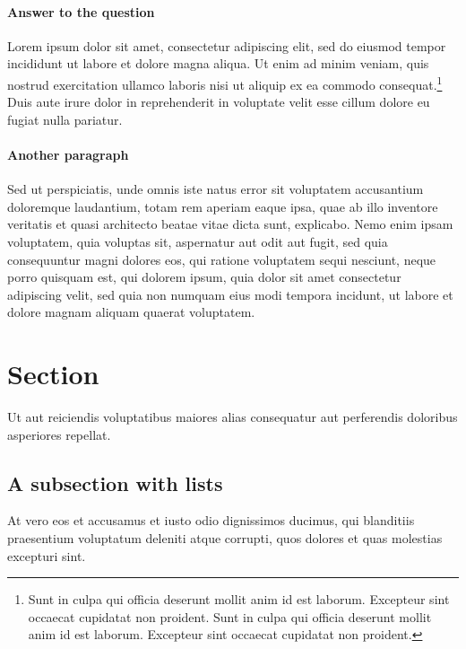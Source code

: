 \documentclass[letterpaper,12pt,leqno]{article}
\begin{document}
\paragraph{Answer to the question} Lorem ipsum dolor sit amet, consectetur adipiscing elit, sed do eiusmod tempor incididunt ut labore et dolore magna aliqua. Ut enim ad minim veniam, quis nostrud exercitation ullamco laboris nisi ut aliquip ex ea commodo consequat.\footnote{Sunt in culpa qui officia deserunt mollit anim id est laborum. Excepteur sint occaecat cupidatat non proident. Sunt in culpa qui officia deserunt mollit anim id est laborum. Excepteur sint occaecat cupidatat non proident.} Duis aute irure dolor in reprehenderit in voluptate velit esse cillum dolore eu fugiat nulla pariatur. 

\paragraph{Another paragraph} Sed ut perspiciatis, unde omnis iste natus error sit voluptatem accusantium doloremque laudantium, totam rem aperiam eaque ipsa, quae ab illo inventore veritatis et quasi architecto beatae vitae dicta sunt, explicabo. Nemo enim ipsam voluptatem, quia voluptas sit, aspernatur aut odit aut fugit, sed quia consequuntur magni dolores eos, qui ratione voluptatem sequi nesciunt, neque porro quisquam est, qui dolorem ipsum, quia dolor sit amet consectetur adipiscing velit, sed quia non numquam eius modi tempora incidunt, ut labore et dolore magnam aliquam quaerat voluptatem.

\section{Section}\label{s:section}

Ut aut reiciendis voluptatibus maiores alias consequatur aut perferendis doloribus asperiores repellat. 

\subsection{A subsection with lists}\label{s:lists}

At vero eos et accusamus et iusto odio dignissimos ducimus, qui blanditiis praesentium voluptatum deleniti atque corrupti, quos dolores et quas molestias excepturi sint.
\end{document}

